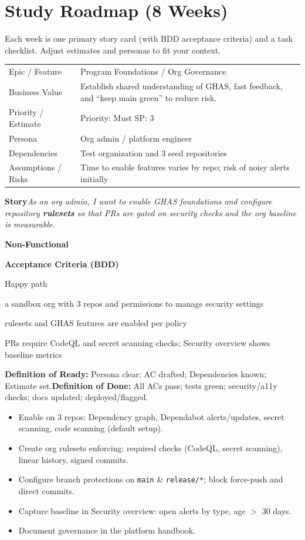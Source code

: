 \documentclass[11pt,a4paper]{article}
\newcommand{\cb}{\(\square\)}
\newenvironment{GHASCard}[2]{%
  \begin{tcolorbox}[ghascard,title={\ghasheader{#1 --- #2}}]
  \small
}{%
  \end{tcolorbox}
}
\newenvironment{GHASTasks}{%
  \begin{tcolorbox}[ghastasks]
  \small
  \begin{itemize}[label=\cb, leftmargin=*, labelsep=0.6em]
}{%
  \end{itemize}
  \end{tcolorbox}
}
\newcommand{\DoR}{\textbf{Definition of Ready:} Persona clear; AC drafted; Dependencies known; Estimate set.}
\newcommand{\DoD}{\textbf{Definition of Done:} All ACs pass; tests green; security/a11y checks; docs updated; deployed/flagged.}
\begin{document}
\section{Study Roadmap (8 Weeks)}
Each week is one primary story card (with BDD acceptance criteria) and a task checklist. Adjust estimates and personas to fit your context.

\begin{GHASCard}{GHAS-1}{Foundations \& Governance}
\begin{tabularx}{\linewidth}{L V}
Epic / Feature & Program Foundations / Org Governance \tabularnewline
Business Value & Establish shared understanding of GHAS, fast feedback, and ``keep main green'' to reduce risk. \tabularnewline
Priority / Estimate & Priority: Must \quad SP: 3 \tabularnewline
Persona & Org admin / platform engineer \tabularnewline
Dependencies & Test organization and 3 seed repositories \tabularnewline
Assumptions / Risks & Time to enable features varies by repo; risk of noisy alerts initially \tabularnewline
\end{tabularx}

\medskip
\textbf{Story}\quad \emph{As an org admin, I want to enable GHAS foundations and configure repository \textbf{rulesets} so that PRs are gated on security checks and the org baseline is measurable.}

\medskip
\textbf{Non-Functional}\quad
{}\ \ 

\medskip
\textbf{Acceptance Criteria (BDD)}
\begin{description}[leftmargin=2.7cm, labelwidth=2.6cm, style=nextline]
  \item[\textbf{Scenario}] Happy path
  \item[\textbf{Given}] a sandbox org with 3 repos and permissions to manage security settings
  \item[\textbf{When}] rulesets and GHAS features are enabled per policy
  \item[\textbf{Then}] PRs require CodeQL and secret scanning checks; Security overview shows baseline metrics
\end{description}

\medskip
\DoR\quad\textbullet\quad\DoD
\end{GHASCard}

\begin{GHASTasks}
\item Enable on 3 repos: Dependency graph, Dependabot alerts/updates, secret scanning, code scanning (default setup).
\item Create org rulesets enforcing: required checks (CodeQL, secret scanning), linear history, signed commits.
\item Configure branch protections on \texttt{main} \& \texttt{release/*}; block force-push and direct commits.
\item Capture baseline in Security overview: open alerts by type, age $>$ 30 days.
\item Document governance in the platform handbook.
\end{GHASTasks}
\clearpage
\end{document}
